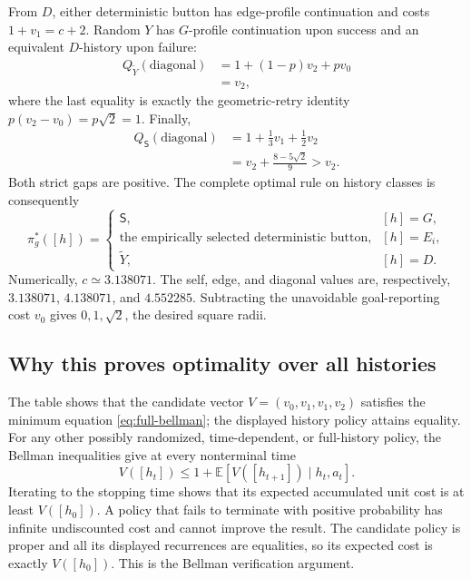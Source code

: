 \documentclass[11pt]{article}
\theoremstyle{definition}
\theoremstyle{remark}
\newcommand{\E}{\mathbb E}
\begin{document}
From \(D\), either deterministic button has edge-profile continuation and
costs \(1+v_1=c+2\). Random \(Y\) has \(G\)-profile continuation upon success
and an equivalent \(D\)-history upon failure:
\begin{align*}
 Q_{\widetilde Y}(\text{diagonal})
 &=1+(1-p)v_2+pv_0\\
 &=v_2,
\end{align*}
where the last equality is exactly the geometric-retry identity
\(p(v_2-v_0)=p\sqrt2=1\). Finally,
\begin{align*}
 Q_{\mathsf S}(\text{diagonal})
 &=1+\frac13v_1+\frac12v_2\\
 &=v_2+\frac{8-5\sqrt2}{9}>v_2.
\end{align*}
Both strict gaps are positive. The complete optimal rule on history classes is
consequently
\begin{equation}
 \pi_g^*([h])=
 \begin{cases}
 \mathsf S,&[h]=G,\\
 \text{the empirically selected deterministic button},&[h]=E_i,\\
 \widetilde Y,&[h]=D.
 \end{cases}
 \label{eq:complete-optimal-policy}
\end{equation}
Numerically, \(c\simeq3.138071\). The self, edge, and diagonal values are,
respectively, \(3.138071\), \(4.138071\), and \(4.552285\). Subtracting the unavoidable
goal-reporting cost \(v_0\) gives \(0,1,\sqrt2\), the desired square radii.

\subsection{Why this proves optimality over all histories}

The table shows that the candidate vector \(V=(v_0,v_1,v_1,v_2)\) satisfies
the minimum equation \eqref{eq:full-bellman}; the displayed history policy
attains equality.  For any other possibly randomized, time-dependent, or
full-history policy, the Bellman inequalities give at every nonterminal time
\[
 V([h_t])\le 1+\E\!\left[V([h_{t+1}])\mid h_t,a_t\right].
\]
Iterating to the stopping time shows that its expected accumulated unit cost
is at least \(V([h_0])\).  A policy that fails to terminate with positive
probability has infinite undiscounted cost and cannot improve the result.  The
candidate policy is proper and all its displayed recurrences are equalities,
so its expected cost is exactly \(V([h_0])\).  This is the Bellman verification
argument.
\end{document}
